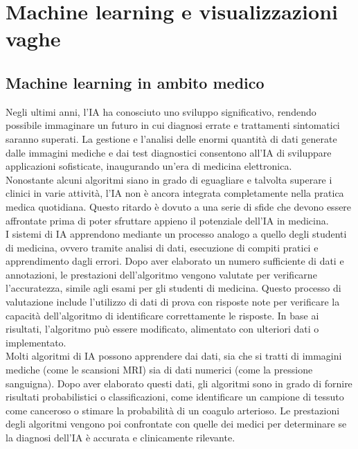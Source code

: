 \chapter{Machine learning e visualizzazioni vaghe}
\label{cap:visualizzazioni-vaghe}

\section{Machine learning in ambito medico }

Negli ultimi anni, l'IA ha conosciuto uno sviluppo significativo, rendendo possibile immaginare un futuro in cui diagnosi errate e trattamenti sintomatici saranno superati. La gestione e l'analisi delle enormi quantità di dati generate dalle immagini mediche e dai test diagnostici consentono all'IA di sviluppare applicazioni sofisticate, inaugurando un'era di medicina elettronica.\\
Nonostante alcuni algoritmi siano in grado di eguagliare e talvolta superare i clinici in varie attività, l'IA non è ancora integrata completamente nella pratica medica quotidiana. Questo ritardo è dovuto a una serie di sfide che devono essere affrontate prima di poter sfruttare appieno il potenziale dell'IA in medicina.\\

I sistemi di IA apprendono mediante un processo analogo a quello degli studenti di medicina, ovvero tramite analisi di dati, esecuzione di compiti pratici e apprendimento dagli errori. Dopo aver elaborato un numero sufficiente di dati e annotazioni, le prestazioni dell'algoritmo vengono valutate per verificarne l'accuratezza, simile agli esami per gli studenti di medicina. Questo processo di valutazione include l'utilizzo di dati di prova con risposte note per verificare la capacità dell'algoritmo di identificare correttamente le risposte. In base ai risultati, l'algoritmo può essere modificato, alimentato con ulteriori dati o implementato.\\

Molti algoritmi di IA possono apprendere dai dati, sia che si tratti di immagini mediche (come le scansioni MRI) sia di dati numerici (come la pressione sanguigna). Dopo aver elaborato questi dati, gli algoritmi sono in grado di fornire risultati probabilistici o classificazioni, come identificare un campione di tessuto come canceroso o stimare la probabilità di un coagulo arterioso. Le prestazioni degli algoritmi vengono poi confrontate con quelle dei medici per determinare se la diagnosi dell'IA è accurata e clinicamente rilevante.\\

